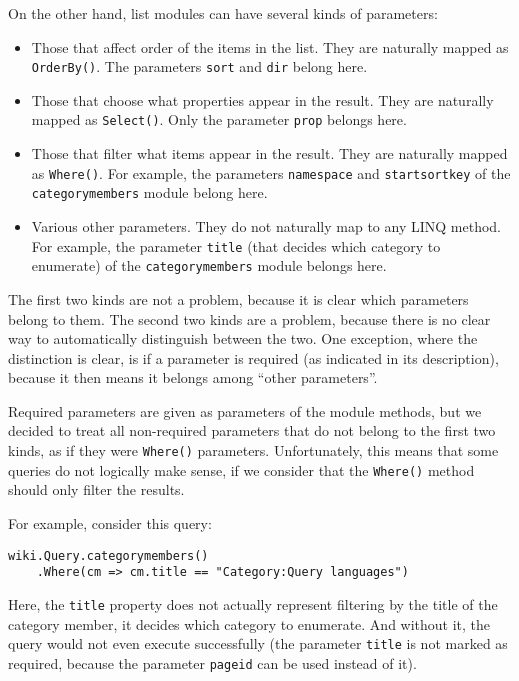 \medskip

On the other hand, list modules can have several kinds of parameters:

\begin{itemize}
\item Those that affect order of the items in the list. They are naturally mapped as \lstinline{OrderBy()}.
The parameters \texttt{sort} and \texttt{dir} belong here.
\item Those that choose what properties appear in the result. They are naturally mapped as \lstinline{Select()}.
Only the parameter \texttt{prop} belongs here.
\item Those that filter what items appear in the result. They are naturally mapped as \lstinline{Where()}.
For example, the parameters \texttt{namespace} and \texttt{startsortkey}
of the \texttt{categorymembers} module belong here.
\item Various other parameters. They do not naturally map to any LINQ method.
For example, the parameter \texttt{title} (that decides which category to enumerate)
of the \texttt{categorymembers} module belongs here.
\end{itemize}

The first two kinds are not a problem, because it is clear which parameters belong to them.
The second two kinds are a problem, because there is no clear way to automatically distinguish between the two.
One exception, where the distinction is clear,
is if a parameter is required (as indicated in its description),
because it then means it belongs among “other parameters”.

Required parameters are given as parameters of the module methods,
but we decided to treat all non-required parameters that do not belong to the first two kinds,
as if they were \lstinline{Where()} parameters.
Unfortunately, this means that some queries do not logically make sense,
if we consider that the \lstinline{Where()} method should only filter the results.

For example, consider this query:

\begin{lstlisting}
wiki.Query.categorymembers()
    .Where(cm => cm.title == "Category:Query languages")
\end{lstlisting}

Here, the \lstinline{title} property does not actually represent filtering
by the title of the category member, it decides which category to enumerate.
And without it, the query would not even execute successfully
(the parameter \texttt{title} is not marked as required, because the parameter \texttt{pageid} can be used instead of it).

